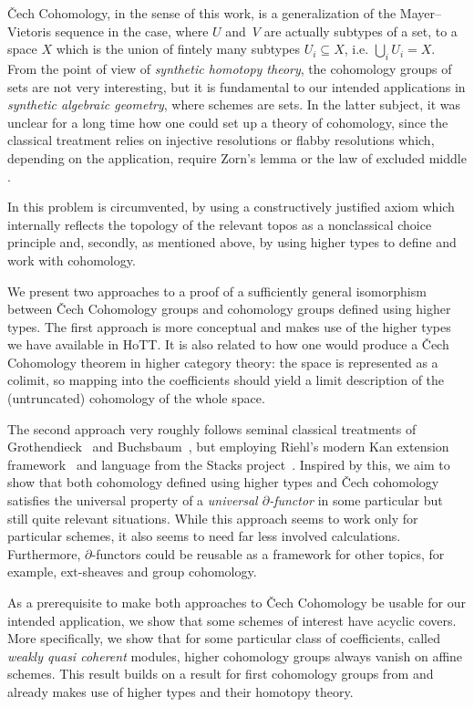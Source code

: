 \documentclass[letterpaper]{../util/easychair}
\newcommand{\notion}[1]{\emph{#1}\index{#1}}
\begin{document}
\v{C}ech Cohomology, in the sense of this work,
is a generalization of the Mayer--Vietoris sequence in the case, where $U$ and~$V$ are actually subtypes of a set,
to a space $X$ which is the union of fintely many subtypes $U_i\subseteq X$, i.e. $\bigcup_{i}U_i=X$.
From the point of view of \emph{synthetic homotopy theory}, the cohomology groups of sets are not very interesting,
but it is fundamental to our intended applications in \emph{synthetic algebraic geometry}, where schemes are sets.
In the latter subject, it was unclear for a long time how one could set up a theory of cohomology,
since the classical treatment relies on injective resolutions or flabby resolutions which, depending on the application, require Zorn's lemma or the law of excluded middle \cite{blechschmidt-flabby}.

In \cite{draft} this problem is circumvented,
by using a constructively justified axiom which internally reflects the topology of the relevant topos
as a nonclassical choice principle
and, secondly, as mentioned above, by using higher types to define and work with cohomology.

We present two approaches to a proof of a sufficiently general isomorphism between \v{C}ech Cohomology groups
and cohomology groups defined using higher types.
The first approach is more conceptual and makes use of the higher types we have available in HoTT.
It is also related to how one would produce a \v{C}ech Cohomology theorem in higher category theory:
the space is represented as a colimit, so mapping into the coefficients should yield a limit description of
the (untruncated) cohomology of the whole space.

The second approach very roughly follows seminal classical treatments of Grothendieck~\cite{tohoku1957} and Buchsbaum~\cite{buchsbaum}, but employing Riehl's modern Kan extension framework~\cite{riehl-cathtpy} and language from the Stacks project~\cite{stacks-project}.
Inspired by this, we aim to show that both cohomology defined using higher types and \v{C}ech cohomology satisfies the universal property
of a \notion{universal $\partial$-functor} in some particular but still quite relevant situations.
While this approach seems to work only for particular schemes,
it also seems to need far less involved calculations.
Furthermore,
$\partial$-functors could be reusable as a framework for other topics, for example,
$\mathrm{ext}$-sheaves and group cohomology.

As a prerequisite to make both approaches to \v{C}ech Cohomology be usable for our intended application,
we show that some schemes of interest have acyclic covers.
More specifically, we show that for some particular class of coefficients, called \emph{weakly quasi coherent} modules,
higher cohomology groups always vanish on affine schemes.
This result builds on a result for first cohomology groups from \cite{draft}
and already makes use of higher types and their homotopy theory.

\printbibliography
\end{document}
